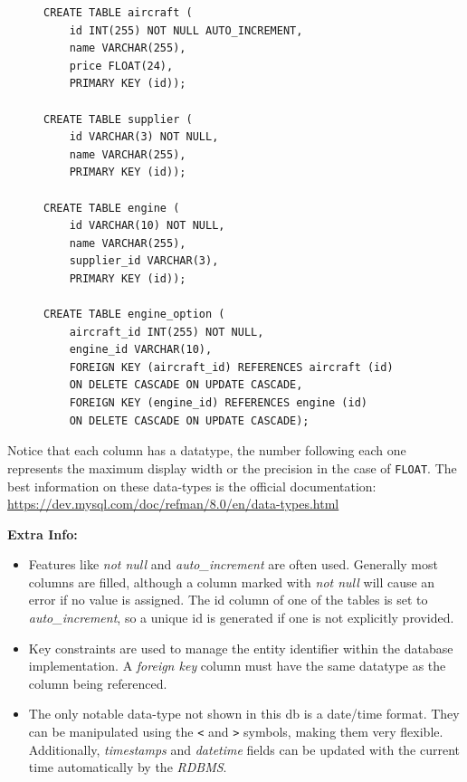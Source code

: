 \documentclass[9pt]{article}
\begin{document}
\begin{figure}[H]
\begin{verbatim}
CREATE TABLE aircraft (
    id INT(255) NOT NULL AUTO_INCREMENT,
    name VARCHAR(255),
    price FLOAT(24),
    PRIMARY KEY (id));

CREATE TABLE supplier (
    id VARCHAR(3) NOT NULL,
    name VARCHAR(255),
    PRIMARY KEY (id));

CREATE TABLE engine (
    id VARCHAR(10) NOT NULL,
    name VARCHAR(255),
    supplier_id VARCHAR(3),
    PRIMARY KEY (id));

CREATE TABLE engine_option (
    aircraft_id INT(255) NOT NULL,
    engine_id VARCHAR(10),
    FOREIGN KEY (aircraft_id) REFERENCES aircraft (id)
    ON DELETE CASCADE ON UPDATE CASCADE,
    FOREIGN KEY (engine_id) REFERENCES engine (id)
    ON DELETE CASCADE ON UPDATE CASCADE);
\end{verbatim}
\end{figure}

Notice that each column has a datatype, the number following each one represents the maximum display width or the precision in the case of \texttt{FLOAT}. The best information on these data-types is the official documentation: \url{https://dev.mysql.com/doc/refman/8.0/en/data-types.html}

\textbf{Extra Info:}

\begin{itemize}
\item Features like \emph{not null} and \emph{auto\_increment} are often used. Generally most columns are filled, although a column marked with \emph{not null} will cause an error if no value is assigned. The id column of one of the tables is set to \emph{auto\_increment}, so a unique id is generated if one is not explicitly provided.
\item Key constraints are used to manage the entity identifier within the database implementation. A \emph{foreign key} column must have the same datatype as the column being referenced.
\item The only notable data-type not shown in this db is a date/time format. They can be manipulated using the \texttt{<} and \texttt{>} symbols, making them very flexible. Additionally, \emph{timestamps} and \emph{datetime} fields can be updated with the current time automatically by the \emph{RDBMS}.
\end{itemize}
\end{document}
